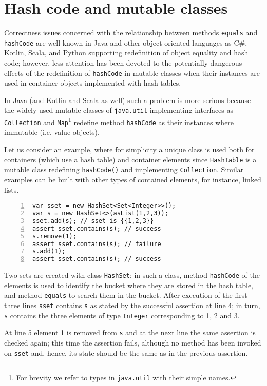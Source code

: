 \section{Hash code and mutable classes}\label{sec:example}

Correctness issues concerned with the relationship between methods \lstinline{equals} and \lstinline{hashCode} are well-known
in Java \cite{Bloch18,OkanoHSON19} and other object-oriented languages as C\#, Kotlin, Scala, and Python supporting redefinition
of object equality and hash code; however, less attention has been devoted to the potentially dangerous effects of the redefinition of 
\lstinline{hashCode} in mutable classes when their instances are used in container objects implemented with hash tables.

In Java (and Kotlin and Scala as well)  such a problem is more serious because the widely used mutable classes of \lstinline{java.util}
implementing interfaces as \lstinline{Collection} and \lstinline{Map}\footnote{For brevity we refer to types in \lstinline{java.util} with their simple names.}  redefine method \lstinline{hashCode} as their instances where immutable (i.e. value objects).

Let us consider an example, where for simplicity a unique class is used both for containers (which use a hash table) and container elements
since \lstinline{HashTable} is a mutable class redefining \lstinline{hashCode()} and implementing \lstinline{Collection}.
Similar examples can be built with other types of contained elements, for instance, linked lists.
\begin{lstlisting}[numbers=left]
var sset = new HashSet<Set<Integer>>();
var s = new HashSet<>(asList(1,2,3));
sset.add(s); // sset is {{1,2,3}}
assert sset.contains(s); // success
s.remove(1);
assert sset.contains(s); // failure
s.add(1);
assert sset.contains(s); // success
\end{lstlisting}
Two sets are created with class \lstinline{HashSet}; in such a class, method \lstinline{hashCode} of the elements is used to identify the
bucket where they are stored in the hash table, and method \lstinline{equals} to search them in the bucket.
After execution of the first three lines \lstinline{sset} contains \lstinline{s} as stated by the successful assertion at line 4; in turn, \lstinline{s}
contains the three elements of type \lstinline{Integer} corresponding to 1, 2 and 3.

At line 5 element 1 is removed from \lstinline{s} and at the next line the same assertion is checked again; this time the assertion fails, although no method has been invoked on \lstinline{sset} and, hence, its state should be the same as in the previous assertion. 


